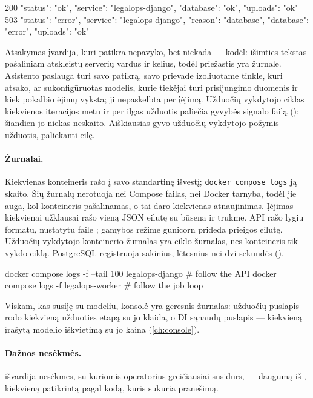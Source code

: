 \begin{codeblock}
200  {"status": "ok", "service": "legalops-django", "database": "ok", "uploads": "ok"}
503  {"status": "error", "service": "legalops-django", "reason": "database",
      "database": "error", "uploads": "ok"}
\end{codeblock}

Atsakymas įvardija, kuri patikra nepavyko, bet niekada --- kodėl: išimties tekstas pašaliniam
atskleistų serverių vardus ir kelius, todėl priežastis yra žurnale. Asistento paslauga turi savo
patikrą,  savo prievade izoliuotame tinkle, kuri atsako, ar sukonfigūruotas modelis,
kurie tiekėjai turi prisijungimo duomenis ir kiek pokalbio ėjimų vyksta; ji nepaskelbta per
įėjimą. Užduočių vykdytojo ciklas kiekvienos iteracijos metu ir per ilgas užduotis paliečia gyvybės
signalo failą (); šiandien jo niekas neskaito. Aiškiausias gyvo
užduočių vykdytojo požymis --- užduotis, paliekanti eilę.

\paragraph{Žurnalai.} Kiekvienas konteineris rašo į savo standartinę išvestį;
\texttt{docker compose logs} ją skaito. Šių žurnalų nerotuoja nei Compose failas, nei
Docker tarnyba, todėl jie auga, kol konteineris pašalinamas, o tai daro kiekvienas atnaujinimas.
Įėjimas kiekvienai užklausai rašo vieną JSON eilutę su būsena ir trukme. API rašo  lygiu
formatu, nustatytu faile ; gamybos režime gunicorn prideda prieigos eilutę. Užduočių
vykdytojo konteinerio žurnalas yra ciklo žurnalas, nes konteineris tik vykdo ciklą. PostgreSQL
registruoja sakinius, lėtesnius nei dvi sekundės ().

\begin{codeblock}
docker compose logs -f --tail 100 legalops-django     # follow the API
docker compose logs -f legalops-worker                # follow the job loop
\end{codeblock}

Viskam, kas susiję su modeliu, konsolė yra geresnis žurnalas: užduočių puslapis rodo kiekvieną
užduoties etapą su jo klaida, o DI sąnaudų puslapis --- kiekvieną įrašytą modelio iškvietimą su
jo kaina (\cref{ch:console}).

\paragraph{Dažnos nesėkmės.}  išvardija nesėkmes, su kuriomis operatorius
greičiausiai susidurs, --- daugumą iš , kiekvieną patikrintą pagal kodą,
kuris sukuria pranešimą.

